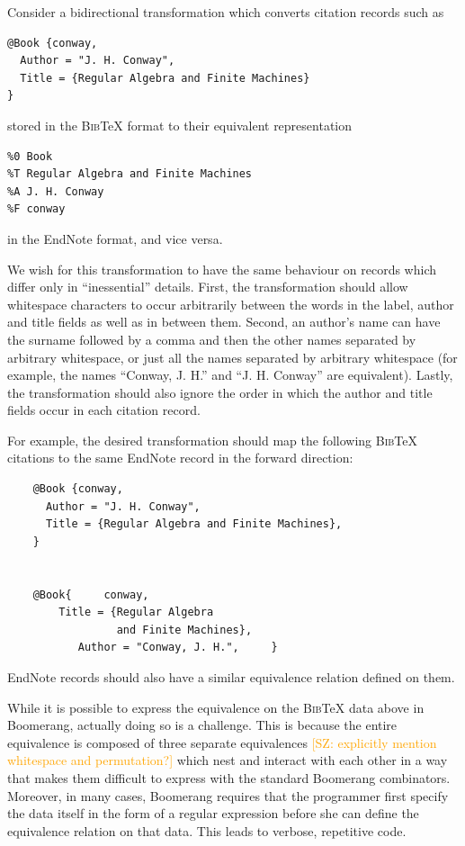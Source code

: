 \documentclass{svproc}
\newcommand{\FINISH}[3]{\ifdraft\textcolor{#1}{[#2: #3]}\fi}
\newcommand{\saz}[1]{\FINISH{orange}{SZ}{#1}}
\newcommand{\bibtex}{\textsc{Bib}\TeX{}}
\begin{document}
Consider a bidirectional transformation which converts citation records such as
\begin{verbatim}
@Book {conway,
  Author = "J. H. Conway",
  Title = {Regular Algebra and Finite Machines}
}
\end{verbatim}

\noindent stored in the \bibtex{} format to their equivalent representation 
\begin{verbatim}
%0 Book
%T Regular Algebra and Finite Machines
%A J. H. Conway
%F conway
\end{verbatim}

\noindent in the EndNote format, and vice versa. 

We wish for this transformation to have the same behaviour on records which
differ only in ``inessential'' details. First, the transformation
should allow whitespace characters to occur arbitrarily between the words in the
label, author and title fields as well as in between them. Second, an
author's name can have the surname followed by a comma and then the other
names separated by arbitrary whitespace, or just all the names separated by
arbitrary whitespace (for example, the names ``Conway, J. H.'' and ``J. H.
Conway'' are equivalent). Lastly, the transformation should also ignore the
order in which the author and title fields occur in each citation record.

For example, the desired transformation should map the following
\bibtex{} citations to the same EndNote record in the forward direction:
\begin{verbatim}
    @Book {conway,
      Author = "J. H. Conway",
      Title = {Regular Algebra and Finite Machines},
    }


    @Book{     conway,
        Title = {Regular Algebra 
                 and Finite Machines},
           Author = "Conway, J. H.",     }
\end{verbatim}
\noindent EndNote records should also have a similar equivalence relation
defined on them.

While it is possible to express the equivalence on the \bibtex{} data above in
Boomerang, actually doing so is a challenge. This is because the entire
equivalence is composed of three separate equivalences \saz{explicitly mention
  whitespace and permutation?} which nest and interact
with each other in a way that makes them difficult to express with the standard
Boomerang combinators. Moreover, in many cases, Boomerang requires that the
programmer first specify the data itself in the form of a regular expression
before she can define the equivalence relation on that data. This leads to
verbose, repetitive code.
\end{document}
